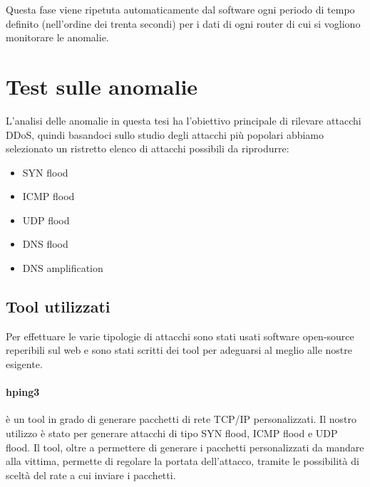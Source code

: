 Questa fase viene ripetuta automaticamente dal software ogni periodo di tempo definito (nell'ordine dei trenta secondi) per i dati di ogni router di cui si vogliono monitorare le anomalie.


\section{Test sulle anomalie}

L'analisi delle anomalie in questa tesi ha l'obiettivo principale di rilevare attacchi DDoS, quindi basandoci sullo studio degli attacchi più popolari abbiamo selezionato un ristretto elenco di attacchi possibili da riprodurre:
\begin{itemize}
    \item SYN flood
    \item ICMP flood
    \item UDP flood
    \item DNS flood
    \item DNS amplification
\end{itemize}

\subsection{Tool utilizzati}

Per effettuare le varie tipologie di attacchi sono stati usati software open-source reperibili sul web e sono stati scritti dei tool per adeguarsi al meglio alle nostre esigente.

\paragraph{hping3} è un tool in grado di generare pacchetti di rete TCP/IP personalizzati. Il nostro utilizzo è stato per generare attacchi di tipo SYN flood, ICMP flood e UDP flood. Il tool, oltre a permettere di generare i pacchetti personalizzati da mandare alla vittima, permette di regolare la portata dell'attacco, tramite le possibilità di sceltà del rate a cui inviare i pacchetti.



